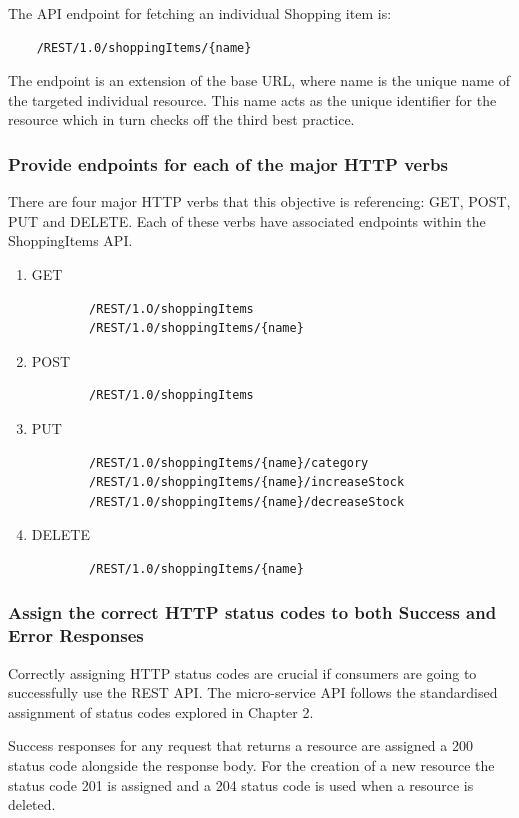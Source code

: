 The API endpoint for fetching an individual Shopping item is:
\begin{verbatim}
    /REST/1.0/shoppingItems/{name}
\end{verbatim}
The endpoint is an extension of the base URL, where {name} is the unique name of the targeted individual resource. This name acts as the unique identifier for the resource which in turn checks off the third best practice.
\subsubsection{Provide endpoints for each of the major HTTP verbs}
There are four major HTTP verbs that this objective is referencing: GET, POST, PUT and DELETE. Each of these verbs have associated endpoints within the ShoppingItems API.
\begin{enumerate}
    \item GET
    \begin{verbatim}
        /REST/1.O/shoppingItems
        /REST/1.0/shoppingItems/{name}
    \end{verbatim}
    \item POST
    \begin{verbatim}
        /REST/1.0/shoppingItems
    \end{verbatim}
    \item PUT
    \begin{verbatim}
        /REST/1.0/shoppingItems/{name}/category
        /REST/1.0/shoppingItems/{name}/increaseStock
        /REST/1.0/shoppingItems/{name}/decreaseStock
    \end{verbatim}
    \item DELETE
    \begin{verbatim}
        /REST/1.0/shoppingItems/{name}
    \end{verbatim}
\end{enumerate}
\subsubsection{Assign the correct HTTP status codes to both Success and Error Responses}
Correctly assigning HTTP status codes are crucial if consumers are going to successfully use the REST API. The micro-service API follows the standardised assignment of status codes explored in Chapter 2.

Success responses for any request that returns a resource  are assigned a 200 status code alongside the response body. For the creation of a new resource the status code 201 is assigned and a 204 status code is used when a resource is deleted.

